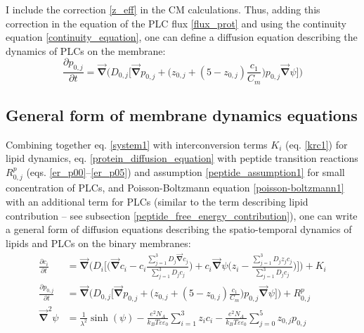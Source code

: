 I include the correction \eqref{z_eff} in the CM calculations. Thus, adding this correction in the equation of the PLC flux \eqref{flux_prot}  and using the continuity equation \eqref{continuity_equation}, one can define a diffusion equation describing the dynamics of PLCs on the membrane:
\begin{equation}
\label{protein_diffusion_equation}
 \frac{\partial p_{0,j}}{\partial t}=\vec{\mathbf{\nabla}} \Big(D_{0,j}\Big[\vec{\mathbf{\nabla}} p_{0,j} + \Big(z_{0,j} + (5 - z_{0,j})\frac{c_1}{C_m}\Big) p_{0,j} \vec{\mathbf{\nabla}}\psi\Big]\Big)
\end{equation}


\subsection{General form of membrane dynamics equations}

Combining together eq. \eqref{system1} with interconversion terms $K_i$ (eq. \eqref{krc1}) for lipid dynamics, eq. \eqref{protein_diffusion_equation} with peptide transition reactions $R_{0,j}^p$ (eqs. \eqref{er_p00}--\eqref{er_p05}) and assumption \eqref{peptide_assumption1} for small concentration of PLCs, and Poisson-Boltzmann equation \eqref{poisson-boltzmann1} with an additional term for PLCs (similar to the term describing lipid contribution -- see subsection \ref{peptide_free_energy_contribution}), one can write a general form of diffusion equations describing the spatio-temporal dynamics of lipids and PLCs on the binary membranes:
\begin{align}
\label{general_system}
\frac{\partial c_i}{\partial t}&=\vec{\mathbf{\nabla}} \Bigg(D_i\Big[\Big(\vec{\mathbf{\nabla}} c_i - c_i\frac{\sum_{j=1}^3 D_j\vec{\mathbf{\nabla}} c_j}{\sum_{j=1}^3 D_j c_j}\Big) + c_i \vec{\mathbf{\nabla}}\psi\Big(z_i - \frac{\sum_{j=1}^3 D_j z_j c_j}{\sum_{j=1}^3 D_j c_j}\Big)\Big]\Bigg) + K_{i} \nonumber \\
\frac{\partial p_{0,j}}{\partial t}&=\vec{\mathbf{\nabla}} \Big(D_{0,j}\Big[\vec{\mathbf{\nabla}} p_{0,j} + \Big(z_{0,j} + (5 - z_{0,j})\frac{c_1}{C_m}\Big) p_{0,j} \vec{\mathbf{\nabla}}\psi\Big]\Big) + R_{0,j}^p \nonumber \\
\vec{\mathbf{\nabla}}^2 \psi&=\frac{1}{\lambda^2}\sinh(\psi) - \frac{e^2 N_A}{k_B T\varepsilon\varepsilon_0} \sum_{i=1}^3 z_i c_i - \frac{e^2 N_A}{k_B T\varepsilon\varepsilon_0} \sum_{j=0}^5 z_{0,j} p_{0,j}
\end{align}